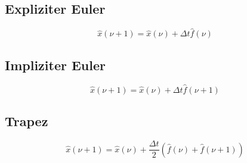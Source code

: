 \documentclass[fs, footer]{latex4ei}
\begin{document}
\begin{multicols*}{4}
{\subsection{Expliziter Euler}
\begin{equation*}
	\hat{x}(\nu + 1) = \hat{x}(\nu) + \Delta t \hat{f}(\nu)
\end{equation*}

\subsection{Impliziter Euler}
\begin{equation*}
	\hat{x}(\nu + 1) = \hat{x}(\nu) + \Delta t \hat{f}(\nu + 1)
\end{equation*}

\subsection{Trapez}
\begin{equation*}
	\hat{x}(\nu + 1) = \hat{x}(\nu) + \frac{\Delta t}{2} (\hat{f}(\nu) + \hat{f}(\nu + 1))
\end{equation*}
}

\end{multicols*}
\end{document}
